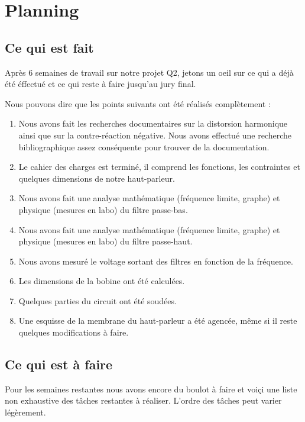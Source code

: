 

\section{Planning}

\subsection{Ce qui est fait}
Après 6 semaines de travail sur notre projet Q2, jetons un oeil sur ce qui a déjà été éffectué et ce qui reste à faire jusqu'au jury final.

Nous pouvons dire que les points suivants ont été réalisés complètement :

\begin{enumerate}
	\item Nous avons fait les recherches documentaires sur la distorsion harmonique ainsi que sur la contre-réaction négative.
	Nous avons effectué une recherche bibliographique assez conséquente pour trouver de la documentation.
	\item Le cahier des charges est terminé, il comprend les fonctions, les contraintes et quelques dimensions de notre haut-parleur.
	\item Nous avons fait une analyse mathématique (fréquence limite, graphe) et physique (mesures en labo) du filtre passe-bas. 
	\item Nous avons fait une analyse mathématique (fréquence limite, graphe) et physique (mesures en labo) du filtre passe-haut.
	\item Nous avons mesuré le voltage sortant des filtres en fonction de la fréquence.
	\item Les dimensions de la bobine ont été calculées.
	\item Quelques parties du circuit ont été soudées.
	\item Une esquisse de la membrane du haut-parleur a été agencée, même si il reste quelques modifications à faire.
\end{enumerate}

\subsection{Ce qui est à faire}

Pour les semaines restantes nous avons encore du boulot à faire et voiçi une liste non exhaustive des tâches restantes à réaliser.
L'ordre des tâches peut varier légèrement.

